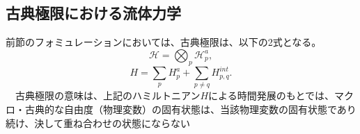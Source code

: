 \subsection{古典極限における流体力学}
前節のフォミュレーションにおいては、古典極限は、以下の2式となる。
\begin{equation}
    \mathcal{H} = \bigotimes_p \mathcal{H}_p^a,
\end{equation}
\begin{equation}
H=\sum_pH_p^a+ \sum_{p \neq q} H^{int}_{p,q}.
\end{equation}
　古典極限の意味は、上記のハミルトニアン$H$による時間発展のもとでは、マクロ・古典的な自由度（物理変数）の固有状態は、当該物理変数の固有状態であり続け、決して重ね合わせの状態にならない